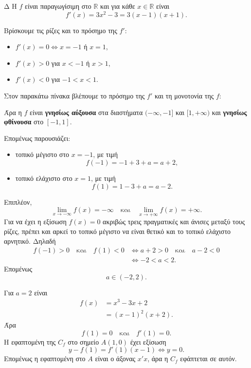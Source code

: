 \begin{thema}{Δ}
Η $f$ είναι παραγωγίσιμη στο $\mathbb{R}$ και για κάθε $x\in\mathbb{R}$ είναι
\[
f'(x)=3x^2-3=3(x-1)(x+1).
\]
\begin{erwthma}
\item Βρίσκουμε τις ρίζες και το πρόσημο της $f'$:
\begin{itemize}
\item $f'(x)=0\Leftrightarrow x=-1$ ή $x=1$,
\item $f'(x)>0$ για $x<-1$ ή $x>1$,
\item $f'(x)<0$ για $-1<x<1$.
\end{itemize}
Στον παρακάτω πίνακα βλέπουμε το πρόσημο της $f'$ και τη μονοτονία της $f$:
\begin{center}
\end{center}

Άρα η $f$ είναι \textbf{γνησίως αύξουσα} στα διαστήματα $(-\infty,-1]$ και $[1,+\infty)$ και \textbf{γνησίως φθίνουσα} στο $[-1,1]$.

Επομένως παρουσιάζει:
\begin{itemize}
\item τοπικό μέγιστο στο $x=-1$, με τιμή
\[
f(-1)=-1+3+a=a+2,
\]
\item τοπικό ελάχιστο στο $x=1$, με τιμή
\[
f(1)=1-3+a=a-2.
\]
\end{itemize}

\item Επιπλέον,
\[
\lim_{x\to-\infty}f(x)=-\infty
\quad\text{και}\quad
\lim_{x\to+\infty}f(x)=+\infty.
\]
Για να έχει η εξίσωση $f(x)=0$ ακριβώς τρεις πραγματικές και άνισες μεταξύ τους ρίζες, πρέπει και αρκεί το τοπικό μέγιστο να είναι θετικό και το τοπικό ελάχιστο αρνητικό. Δηλαδή
\begin{align*}
f(-1)>0\quad\text{και}\quad f(1)<0
&\Leftrightarrow a+2>0\quad\text{και}\quad a-2<0\\
&\Leftrightarrow -2<a<2.
\end{align*}
Επομένως
\[
{a\in(-2,2)}.
\]

\item Για $a=2$ είναι
\begin{align*}
f(x)
&=x^3-3x+2\\
&=(x-1)^2(x+2).
\end{align*}
Άρα
\[
f(1)=0
\quad\text{και}\quad
f'(1)=0.
\]
Η εφαπτομένη της $C_f$ στο σημείο $A(1,0)$ έχει εξίσωση
\[
y-f(1)=f'(1)(x-1)\Leftrightarrow {y=0}.
\]
Επομένως η εφαπτομένη στο $A$ είναι ο άξονας $x'x$, άρα η $C_f$ εφάπτεται σε αυτόν.


\end{erwthma}
\end{thema}
